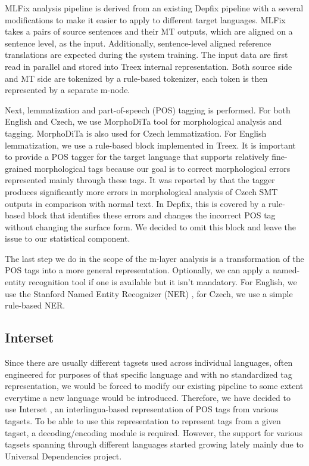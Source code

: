 MLFix analysis pipeline is derived from an existing Depfix pipeline
with a several modifications to make it easier to apply to different
target languages. MLFix takes a pairs of source sentences and their MT outputs, which
are aligned on a sentence level, as the input. Additionally, sentence-level aligned reference
translations are expected during the system training.
The input data are first read in parallel and stored into Treex internal representation.
Both source side and MT side are tokenized by a rule-based tokenizer, each token is then
represented by a separate m-node.

Next, lemmatization and part-of-speech (POS) tagging is performed.
For both English and Czech, we use MorphoDiTa \citep{strakova14:morphodita}
tool for morphological analysis and tagging. MorphoDiTa is also used for Czech lemmatization.
For English lemmatization, we use a rule-based block implemented in Treex.
It is important to provide a POS tagger for the target language that supports
relatively fine-grained morphological tags because our goal is to correct morphological
errors represented mainly through these tags.
It was reported by \citet[p. 33]{biblio:RoAutomaticpostediting2013} that the tagger produces significantly more
errors in morphological analysis of Czech SMT outputs in comparison with normal text. In Depfix, this is covered
by a rule-based block that identifies these errors and changes the incorrect POS tag without
changing the surface form. We decided to omit this block and leave the issue to our statistical
component.

The last step we do in the scope of the m-layer analysis is a transformation of the POS tags into
a more general representation. Optionally, we can apply a named-entity recognition
tool if one is available but it isn't mandatory. For English, we use the Stanford
Named Entity Recognizer (NER) \citep{Finkel:2005:INI:1219840.1219885},
for Czech, we use a simple rule-based NER. 

\subsection{Interset}

Since there are usually different tagsets used across individual languages,
often engineered for purposes of that specific language and with no standardized
tag representation,
we would be forced to modify our existing pipeline to some extent everytime
a new language would be introduced.
Therefore, we have decided to use Interset \citep{biblio:ZeReusableTagset2008}, an interlingua-based
representation of POS tags from various tagsets. To be able to use this
representation to represent tags from a given tagset, a decoding/encoding
module is required. However, the support for various tagsets spanning
through different languages started growing lately mainly due to Universal Dependencies \citep{universal-dep:2016} project.

